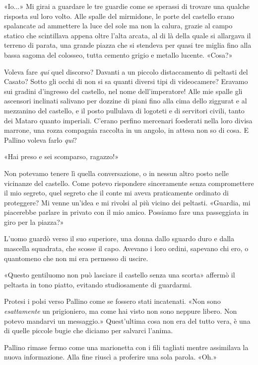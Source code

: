 «Io...» Mi girai a guardare le tre guardie come se sperassi di trovare
una qualche risposta sul loro volto. Alle spalle del mirmidone, le porte
del castello erano spalancate ad ammettere la luce del sole ma non la
calura, grazie al campo statico che scintillava appena oltre l'alta
arcata, al di là della quale si allargava il terreno di parata, una
grande piazza che si stendeva per quasi tre miglia fino alla bassa
sagoma del colosseo, tutta cemento grigio e metallo lucente. «Cosa?»

Voleva fare \emph{qui} quel discorso? Davanti a un piccolo distaccamento
di peltasti del Casato? Sotto gli occhi di non si sa quanti diversi tipi
di videocamere? Eravamo sui gradini d'ingresso del castello, nel nome
dell'imperatore! Alle mie spalle gli ascensori inclinati salivano per
dozzine di piani fino alla cima dello ziggurat e al mezzanino del
castello, e il posto pullulava di logoteti e di servitori civili, tanto
dei Mataro quanto imperiali. C'erano perfino mercenari foederati nella
loro divisa marrone, una rozza compagnia raccolta in un angolo, in
attesa non so di cosa. E Pallino voleva farlo \emph{qui}?

«Hai preso e sei scomparso, ragazzo!»

Non potevamo tenere lì quella conversazione, o in nessun altro posto
nelle vicinanze del castello. Come potevo rispondere sinceramente senza
compromettere il mio segreto, quel segreto che il conte mi aveva
praticamente ordinato di proteggere? Mi venne un'idea e mi rivolsi al
più vicino dei peltasti. «Guardia, mi piacerebbe parlare in privato con
il mio amico. Possiamo fare una passeggiata in giro per la piazza?»

L'uomo guardò verso il suo superiore, una donna dallo sguardo duro e
dalla mascella squadrata, che scosse il capo. Avevano i loro ordini,
sapevano chi ero, o quantomeno che non mi era permesso di uscire.

«Questo gentiluomo non può lasciare il castello senza una scorta»
affermò il peltasta in tono piatto, evitando studiosamente di guardarmi.

Protesi i polsi verso Pallino come se fossero stati incatenati. «Non
sono \emph{esattamente} un prigioniero, ma come hai visto non sono
neppure libero. Non potevo mandarvi un messaggio.» Quest'ultima cosa non
era del tutto vera, è una di quelle piccole bugie che diciamo per
salvarci l'anima.

Pallino rimase fermo come una marionetta con i fili tagliati mentre
assimilava la nuova informazione. Alla fine riuscì a proferire una sola
parola. «Oh.»

